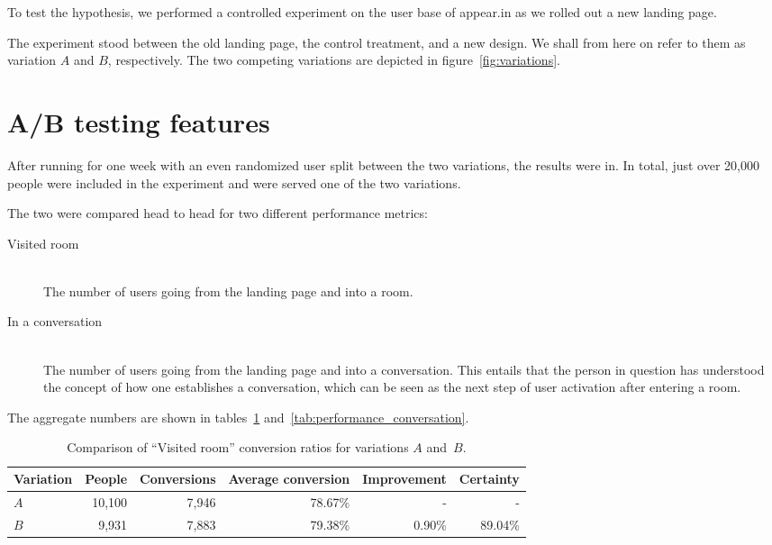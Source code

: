 To test the hypothesis, we performed a controlled experiment on the user base of appear.in as we rolled out a new landing page.

The experiment stood between the old landing page, the control treatment, and a new design. We shall from here on refer to them as variation $A$ and $B$, respectively. The two competing variations are depicted in figure~\ref{fig:variations}.

\section{A/B testing features}
\label{eval:sec:ab_testing_features}

After running for one week with an even randomized user split between the two variations, the results were in. In total, just over 20,000 people were included in the experiment and were served one of the two variations.

The two were compared head to head for two different performance metrics:

\begin{description}
  \item[Visited room] \hfill \\
    The number of users going from the landing page and into a room.
  \item[In a conversation] \hfill \\
    The number of users going from the landing page and into a conversation. This entails that the person in question has understood the concept of how one establishes a conversation, which can be seen as the next step of user activation after entering a room.
\end{description}

The aggregate numbers are shown in tables~\ref{tab:performance_room} and~\ref{tab:performance_conversation}.

\begin{table}[h]
  \begin{tabular}{|l|r|r|r|r|r|}
    \hline
    Variation & People & Conversions & Average conversion & Improvement & Certainty \\ \hline
    $A$       & 10,100 & 7,946       & 78.67\%            & -           & -         \\ \hline
    $B$       &  9,931 & 7,883       & 79.38\%            & 0.90\%      & 89.04\%   \\ \hline
  \end{tabular}
  \caption{Comparison of ``Visited room'' conversion ratios for variations $A$ and~$B$.}
  \label{tab:performance_room}
\end{table}

